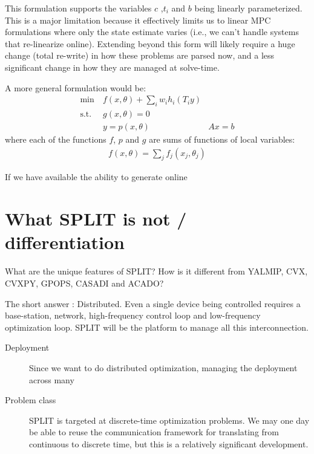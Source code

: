 \documentclass[11pt,a4paper]{article}
\begin{document}
This formulation supports the variables $c$ ,$t_i$ and $b$ being linearly parameterized. This is a major limitation because it effectively limits us to linear MPC formulations where only the state estimate varies (i.e., we can't handle systems that re-linearize online). Extending beyond this form will likely require a huge change (total re-write) in how these problems are parsed now, and a less significant change in how they are managed at solve-time.

A more general formulation would be:
\begin{align*}
  \min\ &f(x,\theta) + \sum_i w_i h_i(T_iy)\\
  \text{s.t.}\ & g(x,\theta) = 0\\
  &y = p(x,\theta)
  &Ax = b
\end{align*}
where each of the functions $f$, $p$ and $g$ are sums of functions of local variables:
\begin{align*}
f(x,\theta) = \sum_j f_j(x_j,\theta_j)
\end{align*}

If we have available the ability to generate online 


\newpage

\section*{What SPLIT is not / differentiation}
What are the unique features of SPLIT? How is it different from YALMIP, CVX, CVXPY, GPOPS, CASADI and ACADO?

The short answer : Distributed. Even a single device being controlled requires a base-station, network, high-frequency control loop and low-frequency optimization loop. SPLIT will be the platform to manage all this interconnection.

\begin{description}
  \item[Deployment] Since we want to do distributed optimization, managing the deployment across many   
  \item[Problem class] SPLIT is targeted at discrete-time optimization problems. We may one day be able to reuse the communication framework for translating from continuous to discrete time, but this is a relatively significant development. 
\end{description}
\end{document}
